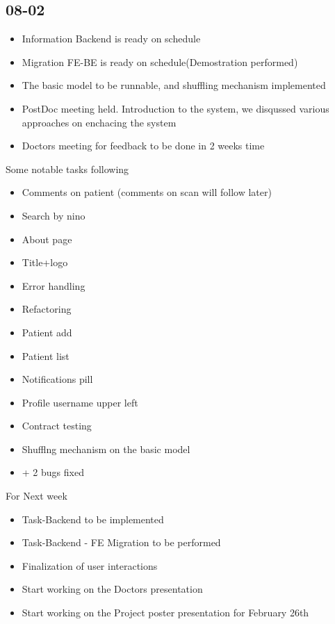 \documentclass[a4paper,11pt,oneside]{book}
\begin{document}
	\subsection{08-02}
	\begin{itemize}
		
		\item Information Backend is ready on schedule
		\item Migration FE-BE is ready on schedule(Demostration performed)
		\item The basic model to be runnable, and shuffling mechanism implemented
		\item PostDoc meeting held. Introduction to the system, we disqussed various approaches on enchacing the system
		\item Doctors meeting for feedback to be done in 2 weeks time
	\end{itemize}
	Some notable tasks following
	\begin{itemize}
		\item Comments on patient (comments on scan will follow later)
		\item Search by nino
		\item About page
		\item Title+logo
		\item Error handling
		\item Refactoring
		\item Patient add
		\item Patient list
		\item Notifications pill
		\item Profile username upper left
		\item Contract testing
		\item Shufflng mechanism on the basic model
		\item + 2 bugs fixed
	\end{itemize}
	For Next week
	\begin{itemize}
		\item Task-Backend to be implemented
		\item Task-Backend - FE Migration to be performed
		\item Finalization of user interactions
		\item Start working on the Doctors presentation
		\item Start working on the Project poster presentation for February 26th
	\end{itemize}
\end{document}
